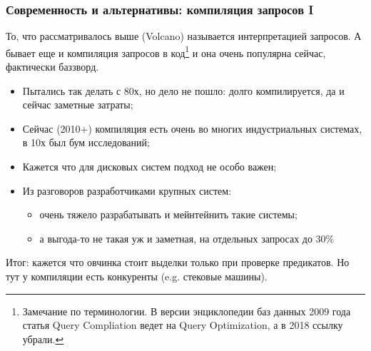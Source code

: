 \documentclass{beamer}
\begin{document}
\begin{frame}
\frametitle{Современность и альтернативы: компиляция запросов I}

	То, что рассматривалось выше (Volcano) называется \alert{интерпретацией} запросов. А бывает еще и \alert{компиляция} запросов в код\footnote{\scriptsize Замечание по терминологии. В версии энциклопедии баз данных 2009 года статья Query Compliation ведет на Query Optimization, а в 2018 ссылку убрали.} и она очень популярна сейчас, фактически баззворд.
	
	\begin{itemize}
		\item Пытались так делать с 80х, но дело не пошло: долго компилируется, да и сейчас заметные затраты;
		\item Сейчас (2010+) компиляция есть очень во многих индустриальных системах, в 10х был бум исследований;
		\item Кажется что для дисковых систем подход не особо важен;
		\item Из разговоров разработчиками крупных систем: 
		\begin{itemize}
			\item очень тяжело разрабатывать и мейнтейнить такие системы;
			\item а выгода-то не такая уж и заметная, на отдельных запросах до 30\%
		\end{itemize}	
	\end{itemize}
	
	Итог: кажется что овчинка стоит выделки только при проверке предикатов. Но тут у компиляции есть конкуренты (e.g. стековые машины).
\end{frame}
\end{document}
